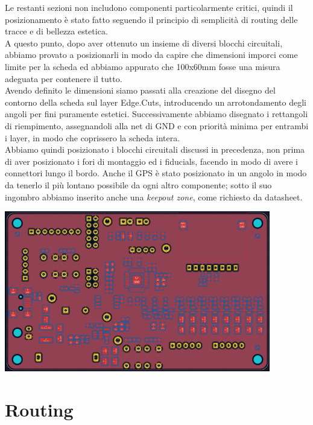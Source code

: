 \noindent Le restanti sezioni non includono componenti particolarmente critici,
quindi il posizionamento è stato fatto seguendo il principio di
semplicità di routing delle tracce e di bellezza estetica.\\
A questo punto, dopo aver ottenuto un insieme di diversi blocchi
circuitali, abbiamo provato a posizionarli in modo da capire che
dimensioni imporci come limite per la scheda ed abbiamo appurato che
100x60mm fosse una misura adeguata per contenere il tutto.\\
Avendo definito le dimensioni siamo passati alla creazione del disegno
del contorno della scheda sul layer Edge.Cuts, introducendo un
arrotondamento degli angoli per fini puramente estetici. Successivamente
abbiamo disegnato i rettangoli di riempimento, assegnandoli alla net di
GND e con priorità minima per entrambi i layer, in modo che coprissero
la scheda intera.\\
Abbiamo quindi posizionato i blocchi circuitali discussi in precedenza,
non prima di aver posizionato i fori di montaggio ed i fiducials,
facendo in modo di avere i connettori lungo il bordo. Anche il GPS è
stato posizionato in un angolo in modo da tenerlo il più lontano
possibile da ogni altro componente; sotto il suo ingombro abbiamo
inserito anche una \emph{keepout zone}, come richiesto da datasheet.

\begin{center}
\includegraphics[width=4.57535in,height=2.75694in]{figures/image21.png}
\captionsetup{type=figure}
\end{center}

\hypertarget{routing}{%
\section{Routing}\label{routing}}


